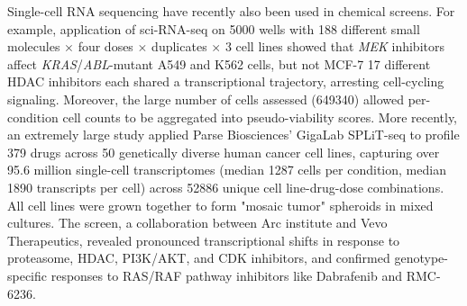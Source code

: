 Single-cell RNA sequencing have recently also been used in chemical screens. For example, application of sci-RNA-seq on \num{5000} wells with 188 different small molecules $\times$ four doses $\times$ duplicates $\times$ 3 cell lines showed that \textit{MEK} inhibitors affect \textit{KRAS}/\textit{ABL}-mutant A549 and K562 cells, but not MCF-7 17 different HDAC inhibitors each shared a transcriptional trajectory, arresting cell-cycling signaling. Moreover, the large number of cells assessed (\num{649340}) allowed per-condition cell counts to be aggregated into pseudo-viability scores. More recently, an extremely large study applied Parse Biosciences' GigaLab SPLiT-seq to profile 379 drugs across 50 genetically diverse human cancer cell lines, capturing over 95.6 million single-cell transcriptomes (median \num{1287} cells per condition, median \num{1890} transcripts per cell) across \num{52886} unique cell line-drug-dose combinations. All cell lines were grown together to form "mosaic tumor" spheroids in mixed cultures. The screen, a collaboration between Arc institute and Vevo Therapeutics, revealed pronounced transcriptional shifts in response to proteasome, HDAC, PI3K/AKT, and CDK inhibitors, and confirmed genotype-specific responses to RAS/RAF pathway inhibitors like Dabrafenib and RMC-6236.



